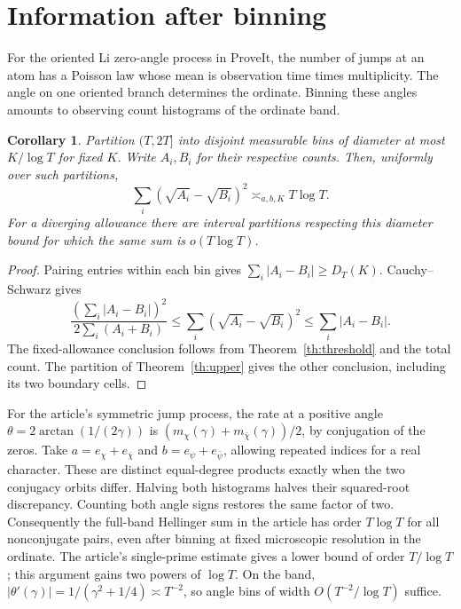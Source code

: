 \documentclass[11pt]{article}
\newtheorem{corollary}[theorem]{Corollary}
\begin{document}
\section{Information after binning}

For the oriented Li zero-angle process in ProveIt, the number of jumps at an
atom has a Poisson law whose mean is observation time times multiplicity.
The angle on one oriented branch determines the ordinate. Binning these
angles amounts to observing count histograms of the ordinate band.

\begin{corollary}\label{cor:hell}
Partition \((T,2T]\) into disjoint measurable bins of diameter at most
\(K/\log T\) for fixed \(K\). Write \(A_i,B_i\) for their respective counts.
Then, uniformly over such partitions,
\[
 \sum_i(\sqrt{A_i}-\sqrt{B_i})^2\asymp_{a,b,K}T\log T .
\]
For a diverging allowance there are interval partitions respecting this
diameter bound for which the same sum is \(o(T\log T)\).
\end{corollary}

\begin{proof}
Pairing entries within each bin gives \(\sum_i|A_i-B_i|\ge D_T(K)\).
Cauchy--Schwarz gives
\[
 \frac{(\sum_i|A_i-B_i|)^2}{2\sum_i(A_i+B_i)}
 \le\sum_i(\sqrt{A_i}-\sqrt{B_i})^2\le\sum_i|A_i-B_i|.
\]
The fixed-allowance conclusion follows from Theorem~\ref{th:threshold} and
the total count. The partition of Theorem~\ref{th:upper} gives the other
conclusion, including its two boundary cells.
\end{proof}

For the article's symmetric jump process, the rate at a positive angle
\(\theta=2\arctan(1/(2\gamma))\) is
\((m_\chi(\gamma)+m_{\bar\chi}(\gamma))/2\), by conjugation of the zeros.
Take \(a=e_\chi+e_{\bar\chi}\) and \(b=e_\psi+e_{\bar\psi}\), allowing repeated
indices for a real character. These are distinct equal-degree products exactly
when the two conjugacy orbits differ. Halving both histograms halves their
squared-root discrepancy. Counting both angle signs restores the same factor
of two. Consequently the full-band Hellinger sum in the article has order
\(T\log T\) for all nonconjugate pairs, even after binning at fixed microscopic
resolution in the ordinate. The article's single-prime estimate gives
a lower bound of order \(T/\log T\); this argument gains two powers of
\(\log T\). On the band, \(|\theta'(\gamma)|=1/(\gamma^2+1/4)\asymp T^{-2}\),
so angle bins of width \(O(T^{-2}/\log T)\) suffice.
\end{document}
